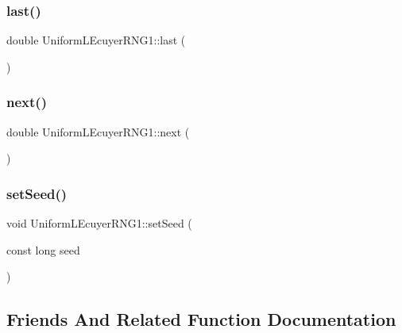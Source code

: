 \subsubsection{\texorpdfstring{last()}{last()}}
{\footnotesize\ttfamily double Uniform\+L\+Ecuyer\+R\+N\+G1\+::last (\begin{DoxyParamCaption}{ }\end{DoxyParamCaption})\hspace{0.3cm}{\ttfamily [inline]}}

\hypertarget{class_uniform_l_ecuyer_r_n_g1_a6a166e0bef412d4c85565ec0017ae489}{}\label{class_uniform_l_ecuyer_r_n_g1_a6a166e0bef412d4c85565ec0017ae489} 
\subsubsection{\texorpdfstring{next()}{next()}}
{\footnotesize\ttfamily double Uniform\+L\+Ecuyer\+R\+N\+G1\+::next (\begin{DoxyParamCaption}{ }\end{DoxyParamCaption})}

\hypertarget{class_uniform_l_ecuyer_r_n_g1_a33e1ea51eb633a14e84d45d8c31a4e8b}{}\label{class_uniform_l_ecuyer_r_n_g1_a33e1ea51eb633a14e84d45d8c31a4e8b} 
\subsubsection{\texorpdfstring{set\+Seed()}{setSeed()}}
{\footnotesize\ttfamily void Uniform\+L\+Ecuyer\+R\+N\+G1\+::set\+Seed (\begin{DoxyParamCaption}\item[{const long}]{seed }\end{DoxyParamCaption})}



\subsection{Friends And Related Function Documentation}
\hypertarget{class_uniform_l_ecuyer_r_n_g1_a2172e86797a63307beeb012b51fe6521}{}\label{class_uniform_l_ecuyer_r_n_g1_a2172e86797a63307beeb012b51fe6521} 

